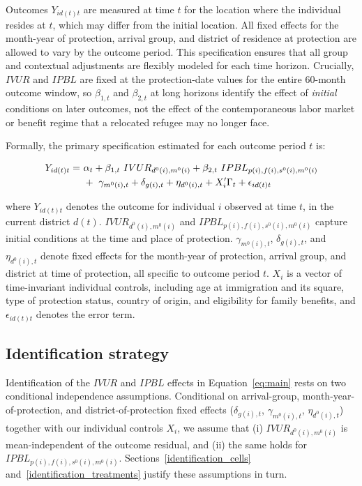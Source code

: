 Outcomes $Y_{i d(t) t}$ are measured at time $t$ for the location where the individual resides at $t$, which may differ from the initial location. All fixed effects for the month-year of protection, arrival group, and district of residence at protection are allowed to vary by the outcome period. This specification ensures that all group and contextual adjustments are flexibly modeled for each time horizon. Crucially, $IVUR$ and $IPBL$ are fixed at the protection-date values for the entire 60-month outcome window, so $\beta_{1,t}$ and $\beta_{2,t}$ at long horizons identify the effect of \emph{initial} conditions on later outcomes, not the effect of the contemporaneous labor market or benefit regime that a relocated refugee may no longer face.

Formally, the primary specification estimated for each outcome period $t$ is:

\begin{align}\label{eq:main}
Y_{i d(t) t} =\ & \alpha_t + \beta_{1,t}\ IVUR_{d^0(i), m^0(i)} + \beta_{2,t}\ IPBL_{p(i), f(i), s^0(i), m^0(i)} \notag \\
& +\ \gamma_{m^0(i), t} + \delta_{g(i), t} + \eta_{d^0(i), t} + X_i'\Gamma_t + \epsilon_{i d(t) t}
\end{align}

where $Y_{i d(t) t}$ denotes the outcome for individual $i$ observed at time $t$, in the current district $d(t)$. $IVUR_{d^0(i), m^0(i)}$ and $IPBL_{p(i), f(i), s^0(i), m^0(i)}$ capture initial conditions at the time and place of protection. $\gamma_{m^0(i), t}$, $\delta_{g(i), t}$, and $\eta_{d^0(i), t}$ denote fixed effects for the month-year of protection, arrival group, and district at time of protection, all specific to outcome period $t$. $X_i$ is a vector of time-invariant individual controls, including age at immigration and its square, type of protection status, country of origin, and eligibility for family benefits, and $\epsilon_{i d(t) t}$ denotes the error term. 

\subsection{Identification strategy} \label{identification}

Identification of the $IVUR$ and $IPBL$ effects in Equation~\ref{eq:main} rests on two conditional independence assumptions. Conditional on arrival-group, month-year-of-protection, and district-of-protection fixed effects ($\delta_{g(i),t}$, $\gamma_{m^0(i),t}$, $\eta_{d^0(i),t}$) together with our individual controls $X_i$, we assume that (i) $IVUR_{d^0(i), m^0(i)}$ is mean-independent of the outcome residual, and (ii) the same holds for $IPBL_{p(i), f(i), s^0(i), m^0(i)}$. Sections~\ref{identification_cells} and~\ref{identification_treatments} justify these assumptions in turn.


